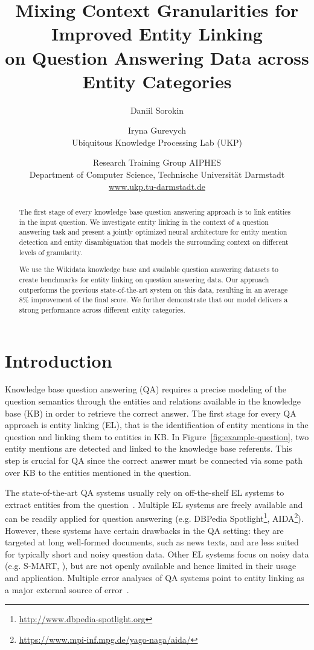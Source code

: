 \documentclass[11pt,a4paper]{article}
\title{Mixing Context Granularities for Improved Entity Linking \\ on Question Answering Data across Entity Categories}
\author{Daniil Sorokin \and Iryna Gurevych\\
Ubiquitous Knowledge Processing Lab (UKP) \and Research Training Group AIPHES \\
Department of Computer Science, Technische Universit\"at Darmstadt \\
  {\url{www.ukp.tu-darmstadt.de}} \\ 
}
\date{}
\begin{document}
\maketitle

\begin{abstract}
The first stage of every knowledge base question answering approach is to link entities in the input question. 
We investigate entity linking in the context of a question answering task and present a jointly optimized neural architecture for entity mention detection and entity disambiguation that models the surrounding context on different levels of granularity. 
  
We use the Wikidata knowledge base and available question answering datasets to create benchmarks for entity linking on question answering data. 
Our approach outperforms the previous state-of-the-art system on this data, resulting in an average 8\% improvement of the final score. We further demonstrate that our model delivers a strong performance across different entity categories.

\end{abstract}


\section{Introduction}

Knowledge base question answering (QA) requires a precise modeling of the question semantics through the entities and relations available in the knowledge base (KB) in order to retrieve the correct answer.
The first stage for every QA approach is entity linking (EL), that is the identification of entity mentions in the question and linking them to entities in KB. In Figure~\ref{fig:example-question}, two entity mentions are detected and linked to the knowledge base referents. This step is crucial for QA since the correct answer must be connected via some path over KB to the entities mentioned in the question. 

The state-of-the-art QA systems usually rely on off-the-shelf EL systems to extract entities from the question~\cite{Yih2015}.
Multiple EL systems are freely available and can be readily applied for question answering (e.g. DBPedia Spotlight\footnote{\url{http://www.dbpedia-spotlight.org}}, AIDA\footnote{\url{https://www.mpi-inf.mpg.de/yago-naga/aida/}}). However, these systems have certain drawbacks in the QA setting: they are targeted at long well-formed documents, such as news texts, and are less suited for typically short and noisy question data. 
Other EL systems focus on noisy data (e.g. S-MART, \citealp{Yang2015a}), but are not openly available and hence limited in their usage and application.
Multiple error analyses of QA systems point to entity linking as a major external source of error~\cite{Berant2014,Reddy2014,Yih2015}.
\end{document}

